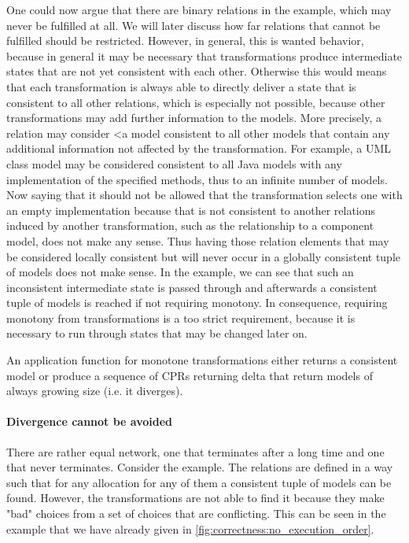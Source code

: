One could now argue that there are binary relations in the example, which may never be fulfilled at all. We will later discuss how far relations that cannot be fulfilled should be restricted. However, in general, this is wanted behavior, because in general it may be necessary that transformations produce intermediate states that are not yet consistent with each other. Otherwise this would means that each transformation is always able to directly deliver a state that is consistent to all other relations, which is especially not possible, because other transformations may add further information to the models. More precisely, a relation may consider <a model consistent to all other models that contain any additional information not affected by the transformation. For example, a UML class model may be considered consistent to all Java models with any implementation of the specified methods, thus to an infinite number of models. Now saying that it should not be allowed that the transformation selects one with an empty implementation because that is not consistent to another relations induced by another transformation, such as the relationship to a component model, does not make any sense. Thus having those relation elements that may be considered locally consistent but will never occur in a globally consistent tuple of models does not make sense.
In the example, we can see that such an inconsistent intermediate state is passed through and afterwards a consistent tuple of models is reached if not requiring monotony.
In consequence, requiring monotony from transformations is a too strict requirement, because it is necessary to run through states that may be changed later on.

\begin{theorem}
    An application function for monotone transformations either returns a consistent model or produce a sequence of CPRs returning delta that return models of always growing size (i.e. it diverges).
\end{theorem}

\paragraph{Divergence cannot be avoided}

There are rather equal network, one that terminates after a long time and one that never terminates. 
Consider the example. The relations are defined in a way such that for any allocation for any of them a consistent tuple of models can be found. However, the transformations are not able to find it because they make "bad" choices from a set of choices that are conflicting. 
This can be seen in the example that we have already given in \autoref{fig:correctness:no_execution_order}.

